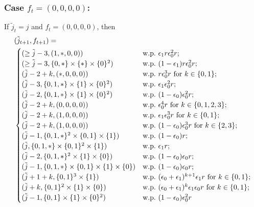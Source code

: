 \documentclass[11pt]{article}
\theoremstyle{plain}
\theoremstyle{definition}
\theoremstyle{remark}
\begin{document}
\subsubsection{Case $f_t = (0,0,0,0)$:}


If $\tilde{j}_t = j$ and $f_t = (0,0,0,0)$, then
\begin{align}
    & (\Tilde{j}_{t+1},f_{t+1}) = \nonumber\\
    & \begin{cases}
    (\geq \Tilde{j}-3,(1,*,0,0)) & \text{w.p.\ } \epsilon_1 r \epsilon_0^2 r;\\
    (\geq \Tilde{j}-3,\{0,*\}\times\{*\}\times\{0\}^2) & \text{w.p.\ } (1-\epsilon_1) r \epsilon_0^2 r;\\
    (\Tilde{j}-2+k,(*,0,0,0)) & \text{w.p.\ } r \epsilon_0^3 r \text{ for } k\in\{0,1\};\\
    (\Tilde{j}-3,\{0,1,*\}\times\{1\}\times\{0\}^2) & \text{w.p.\ }     \epsilon_1 \epsilon_0^2 r;\\
    (\Tilde{j}-2,\{0,1,*\}\times\{1\}\times\{0\}^2) & \text{w.p.\ }     (1-\epsilon_0) \epsilon_0^2 r;\\
    (\Tilde{j}-2+k,(0,0,0,0)) & \text{w.p.\ } \epsilon_0^4r \text{ for } k\in\{0,1,2,3\};\\
    (\Tilde{j}-2+k,(1,0,0,0)) & \text{w.p.\ } \epsilon_1 \epsilon_0^3 r \text{ for } k\in\{0,1\};\\
    (\Tilde{j}-2+k,(1,0,0,0)) & \text{w.p.\ }      (1-\epsilon_0) \epsilon_0^3 r \text{ for } k \in\{2,3\};\\
    (\Tilde{j}-1,\{0,1,*\}^2\times\{0,1\}\times\{1\}) & \text{w.p.\ } (1-\epsilon_0)r;\\
    (\Tilde{j},\{0,1,*\}\times\{0,1\}^2\times\{1\}) & \text{w.p.\ } \epsilon_1r;\\
    (\Tilde{j}-2,\{0,1,*\}^2\times\{1\}\times\{0\}) & \text{w.p.\ } (1-\epsilon_0) \epsilon_0 r;\\
    (\Tilde{j}-1,\{0,1,*\}\times\{0,1\}\times\{1\}\times\{0\}) & \text{w.p.\ } (1-\epsilon_0) \epsilon_0 r;\\
    (\Tilde{j}+1+k,\{0,1\}^3\times\{1\}) & \text{w.p.\ } (\epsilon_0+\epsilon_1)^{k+1} \epsilon_1 r \text{ for } k\in\{0,1\};\\
    (\Tilde{j}+k,\{0,1\}^2\times\{1\}\times\{0\}) & \text{w.p.\ } (\epsilon_0+\epsilon_1)^{k} \epsilon_1 \epsilon_0 r \text{ for } k\in\{0,1\};\\
    (\Tilde{j}-1,\{0,1\}\times\{1\}\times\{0\}^2) & \text{w.p.\ } (1-\epsilon_0) \epsilon_0^2 r\\

\end{cases}
\end{align}
\end{document}
